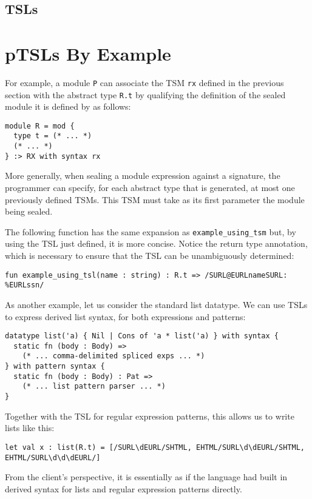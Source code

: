 \subsection{TSLs}

\section{pTSLs By Example}
For example, a module \lstinline{P} can associate the TSM \lstinline{rx} defined in the previous section with the abstract type \lstinline{R.t} by qualifying the definition of the sealed module it is defined by as follows:
\begin{lstlisting}[numbers=none]
module R = mod {
  type t = (* ... *)
  (* ... *)
} :> RX with syntax rx
\end{lstlisting}
More generally, when sealing a module expression against a signature, the programmer can specify, for each abstract type that is generated, at most one previously defined TSMs. This TSM must take as its first parameter the module being sealed.

The following function has the same expansion as \lstinline{example_using_tsm} but, by using the TSL just defined, it is more concise. Notice the return type annotation, which is necessary to ensure that the TSL can be unambiguously determined:
\begin{lstlisting}[numbers=none]
fun example_using_tsl(name : string) : R.t => /SURL@EURLnameSURL: %EURLssn/
\end{lstlisting}

As another example, let us consider the standard list datatype. We can use TSLs to express derived list syntax, for both expressions and patterns:
\begin{lstlisting}[numbers=none]
datatype list('a) { Nil | Cons of 'a * list('a) } with syntax {
  static fn (body : Body) => 
    (* ... comma-delimited spliced exps ... *)
} with pattern syntax {
  static fn (body : Body) : Pat => 
    (* ... list pattern parser ... *)
}
\end{lstlisting}
Together with the TSL for regular expression patterns, this allows us to write lists like this:
\begin{lstlisting}[numbers=none]
let val x : list(R.t) = [/SURL\dEURL/SHTML, EHTML/SURL\d\dEURL/SHTML, EHTML/SURL\d\d\dEURL/]
\end{lstlisting}
From the client's perspective, it is essentially as if the language had built in derived syntax for lists and regular expression patterns directly.%

